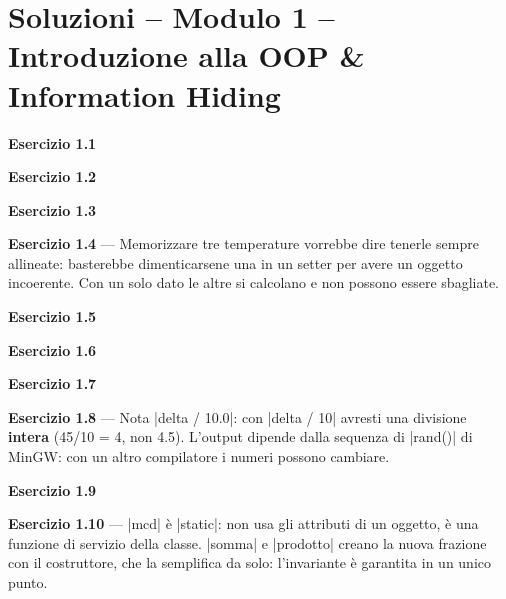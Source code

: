 \chapter{Soluzioni -- Modulo 1 -- Introduzione alla OOP \& Information Hiding}
\textbf{Esercizio 1.1}

\textbf{Esercizio 1.2}

\textbf{Esercizio 1.3}

\textbf{Esercizio 1.4} --- Memorizzare tre temperature vorrebbe dire tenerle
sempre allineate: basterebbe dimenticarsene una in un setter per avere un oggetto
incoerente. Con un solo dato le altre si calcolano e non possono essere sbagliate.

\textbf{Esercizio 1.5}

\textbf{Esercizio 1.6}

\textbf{Esercizio 1.7}

\textbf{Esercizio 1.8} --- Nota \cc|delta / 10.0|: con \cc|delta / 10| avresti una
divisione \textbf{intera} (45/10 = 4, non 4.5). L'output dipende dalla sequenza
di \cc|rand()| di MinGW: con un altro compilatore i numeri possono cambiare.

\textbf{Esercizio 1.9}

\textbf{Esercizio 1.10} --- \cc|mcd| è \cc|static|: non usa gli attributi di un
oggetto, è una funzione di servizio della classe. \cc|somma| e \cc|prodotto|
creano la nuova frazione con il costruttore, che la semplifica da solo:
l'invariante è garantita in un unico punto.
